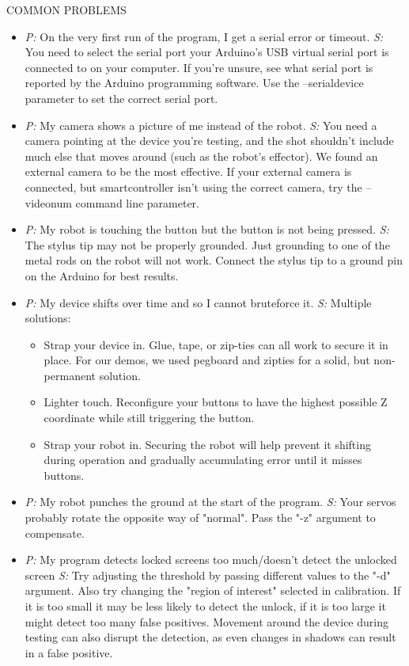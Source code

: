 \documentclass[a4paper,12pt]{letter}
\begin{document}
COMMON PROBLEMS
\begin{itemize}
\item \emph{P:} On the very first run of the program, I get a serial error or timeout.
\emph{S:} You need to select the serial port your Arduino's USB virtual serial port is connected to on your computer. If you're unsure, see what serial port is reported by the Arduino programming software. Use the --serialdevice parameter to set the correct serial port.
\item \emph{P:} My camera shows a picture of me instead of the robot.
\emph{S:} You need a camera pointing at the device you're testing, and the shot shouldn't include much else that moves around (such as the robot's effector).  We found an external camera to be the most effective.  If your external camera is connected, but smartcontroller isn't using the correct camera, try the --videonum command line parameter.
\item \emph{P:} My robot is touching the button but the button is not being pressed.
\emph{S:} The stylus tip may not be properly grounded. Just grounding to one of the metal rods on the robot will not work. Connect the stylus tip to a ground pin on the Arduino for best results.
\item \emph{P:} My device shifts over time and so I cannot bruteforce it.
\emph{S:} Multiple solutions: 
\begin{itemize}
\item Strap your device in. Glue, tape, or zip-ties can all work to secure it in place. For our demos, we used pegboard and zipties for a solid, but non-permanent solution.
\item Lighter touch. Reconfigure your buttons to have the highest possible Z coordinate while still triggering the button.
\item Strap your robot in. Securing the robot will help prevent it shifting during operation and gradually accumulating error until it misses buttons.
\end{itemize}
\item \emph{P:} My robot punches the ground at the start of the program.
\emph{S:} Your servos probably rotate the opposite way of "normal". Pass the "-z" argument to compensate.
\item \emph{P:} My program detects locked screens too much/doesn't detect the unlocked screen
\emph{S:} Try adjusting the threshold by passing different values to the "-d" argument. Also try changing the "region of interest" selected in calibration. If it is too small it may be less likely to detect the unlock, if it is too large it might detect too many false positives.  Movement around the device during testing can also disrupt the detection, as even changes in shadows can result in a false positive.
\end{itemize}
\end{document}
